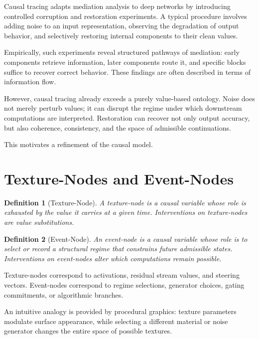 \documentclass[11pt]{article}
\newtheorem{definition}{Definition}
\theoremstyle{remark}
\begin{document}
Causal tracing adapts mediation analysis to deep networks by introducing controlled corruption and restoration experiments. A typical procedure involves adding noise to an input representation, observing the degradation of output behavior, and selectively restoring internal components to their clean values.

Empirically, such experiments reveal structured pathways of mediation: early components retrieve information, later components route it, and specific blocks suffice to recover correct behavior. These findings are often described in terms of information flow.

However, causal tracing already exceeds a purely value-based ontology. Noise does not merely perturb values; it can disrupt the regime under which downstream computations are interpreted. Restoration can recover not only output accuracy, but also coherence, consistency, and the space of admissible continuations.

This motivates a refinement of the causal model.

\section{Texture-Nodes and Event-Nodes}

\begin{definition}[Texture-Node]
A \emph{texture-node} is a causal variable whose role is exhausted by the value it carries at a given time. Interventions on texture-nodes are value substitutions.
\end{definition}

\begin{definition}[Event-Node]
An \emph{event-node} is a causal variable whose role is to select or record a structural regime that constrains future admissible states. Interventions on event-nodes alter which computations remain possible.
\end{definition}

Texture-nodes correspond to activations, residual stream values, and steering vectors. Event-nodes correspond to regime selections, generator choices, gating commitments, or algorithmic branches.

An intuitive analogy is provided by procedural graphics: texture parameters modulate surface appearance, while selecting a different material or noise generator changes the entire space of possible textures.
\end{document}
